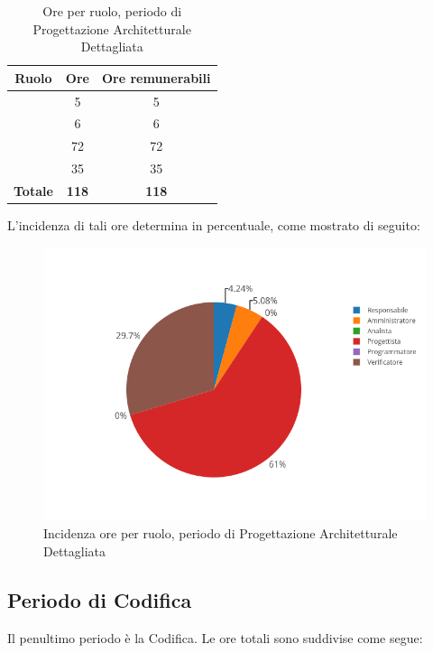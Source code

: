 \begin{table}[H]
	\begin{center}
		\begin{tabular}{|c|c|c|}
			\hline
			\textbf{Ruolo}	& \textbf{Ore}	& \textbf{Ore remunerabili} \\
			\hline
			\Res	&	5	&	5 \\
			\hline
			\Amm	&	6	&	6	\\
			\hline
			\Prog   &	72   &	72	\\
			\hline
			\Ver	&	35	&	35	\\
			\hline
			\textbf{Totale} & \textbf{118} & \textbf{118} \\
			\hline
		\end{tabular}
	\end{center}
	\caption{Ore per ruolo, periodo di Progettazione Architetturale Dettagliata}
\end{table}

L'incidenza di tali ore determina in percentuale, come mostrato di seguito:
\begin{figure}[H]
	\centering
	\includegraphics[scale=0.6]{img/ProgettazioneDettaglio.png}
	\caption{Incidenza ore per ruolo, periodo di Progettazione Architetturale Dettagliata}
\end{figure}

\subsection{Periodo di Codifica}
Il penultimo periodo è la Codifica. Le ore totali sono suddivise come segue:


